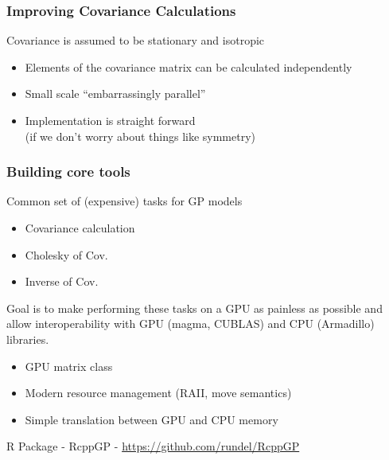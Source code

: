 \documentclass[t]{beamer}\usepackage[]{graphicx}\usepackage[]{color}
\begin{document}
\begin{frame}
\frametitle{Improving Covariance Calculations}
    
Covariance is assumed to be stationary and isotropic
\begin{itemize}
\item Elements of the covariance matrix can be calculated independently
\item Small scale ``embarrassingly parallel''
\item Implementation is straight forward \\ (if we don't worry about things like symmetry)
\end{itemize}

\vfill
\begin{center}
\end{center}
\vfill

\end{frame}





\begin{frame}
\frametitle{Building core tools}

Common set of (expensive) tasks for GP models

\vspace{1mm}

\begin{itemize}
\item Covariance calculation
\item Cholesky of Cov. 
\item Inverse of Cov. 
\end{itemize}

\vspace{2mm}

Goal is to make performing these tasks on a GPU as painless as possible and allow interoperability with GPU (magma, CUBLAS) and CPU (Armadillo) libraries.

\begin{itemize}
\item GPU matrix class
\item Modern resource management (RAII, move semantics)
\item Simple translation between GPU and CPU memory
\end{itemize}

\vfill

R Package - RcppGP - \url{https://github.com/rundel/RcppGP}

\end{frame}
\end{document}
